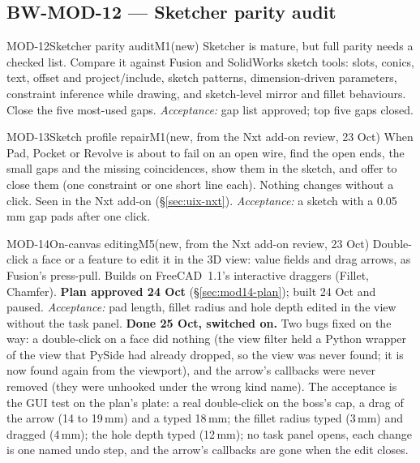 

\subsection{BW-MOD-12 --- Sketcher parity audit}

\begin{epic}{MOD-12}{Sketcher parity audit}{M1}{\stTodo}{(new)}
Sketcher is mature, but full parity needs a checked list. Compare it against Fusion and SolidWorks sketch tools:
slots, conics, text, offset and project/include, sketch patterns, dimension-driven parameters, constraint
inference while drawing, and sketch-level mirror and fillet behaviours. Close the five most-used gaps.
\emph{Acceptance:} gap list approved; top five gaps closed.
\end{epic}

\begin{epic}{MOD-13}{Sketch profile repair}{M1}{\stTodo}{(new, from the Nxt add-on review, 23 Oct)}
When Pad, Pocket or Revolve is about to fail on an open wire, find the open ends, the small gaps and the
missing coincidences, show them in the sketch, and offer to close them (one constraint or one short line each).
Nothing changes without a click. Seen in the Nxt add-on (\S\ref{sec:uix-nxt}).
\emph{Acceptance:} a sketch with a 0.05\,mm gap pads after one click.
\end{epic}

\begin{epic}{MOD-14}{On-canvas editing}{M5}{\stDone}{(new, from the Nxt add-on review, 23 Oct)}
Double-click a face or a feature to edit it in the 3D view: value fields and drag arrows, as Fusion's press-pull.
Builds on FreeCAD~1.1's interactive draggers (Fillet, Chamfer). \textbf{Plan approved 24 Oct}
(\S\ref{sec:mod14-plan}); built 24 Oct and paused.
\emph{Acceptance:} pad length, fillet radius and hole depth edited in the view without the task panel.
\textbf{Done 25 Oct, switched on.} Two bugs fixed on the way: a double-click on a face did nothing (the view filter
held a Python wrapper of the view that PySide had already dropped, so the view was never found; it is now found
again from the viewport), and the arrow's callbacks were never removed (they were unhooked under the wrong kind
name). The acceptance is the GUI test  on the plan's plate: a real
double-click on the boss's cap, a drag of the arrow (14 to 19\,mm) and a typed 18\,mm; the fillet radius typed (3\,mm)
and dragged (4\,mm); the hole depth typed (12\,mm); no task panel opens, each change is one named undo step, and the
arrow's callbacks are gone when the edit closes.
\end{epic}






